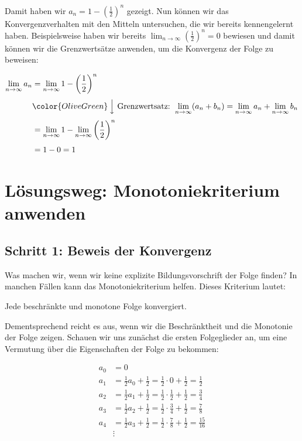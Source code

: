 \documentclass[fontsize=9pt,
               parskip=half-,
               DIV=14,
               listof=chapterentry,
               tocflat]{scrbook}
\begin{document}
Damit haben wir $a_{n}=1-\left({\frac {1}{2}}\right)^{n}$ gezeigt. Nun können wir das Konvergenzverhalten mit den Mitteln untersuchen, die wir bereits kennengelernt haben. Beispielsweise haben wir bereits $\lim _{n\to \infty }\left({\frac {1}{2}}\right)^{n}=0$ bewiesen und damit können wir die Grenzwertsätze anwenden, um die Konvergenz der Folge zu beweisen:

\begin{align*}
\lim _{n\to \infty }a_{n}&=\lim _{n\to \infty }1-\left({\frac {1}{2}}\right)^{n}\\[0.3em]&{\color {OliveGreen}\left\downarrow \ {\text{Grenzwertsatz: }}\lim _{n\to \infty }(a_{n}+b_{n})=\lim _{n\to \infty }a_{n}+\lim _{n\to \infty }b_{n}\right.}\\[0.3em]&=\lim _{n\to \infty }1-\lim _{n\to \infty }\left({\frac {1}{2}}\right)^{n}\\[0.3em]&=1-0=1
\end{align*}
\clearpage
\section{Lösungsweg: Monotoniekriterium anwenden}

\subsection{Schritt 1: Beweis der Konvergenz}

Was machen wir, wenn wir keine explizite Bildungsvorschrift der Folge finden? In manchen Fällen kann das Monotoniekriterium helfen. Dieses Kriterium lautet:

\begin{importantparagraph*}
Jede beschränkte und monotone Folge konvergiert.

\end{importantparagraph*}

Dementsprechend reicht es aus, wenn wir die Beschränktheit und die Monotonie der Folge zeigen. Schauen wir uns zunächst die ersten Folgeglieder an, um eine Vermutung über die Eigenschaften der Folge zu bekommen:

\begin{align*}
a_{0}&=0\\[0.3em]a_{1}&={\frac {1}{2}}a_{0}+{\frac {1}{2}}={\frac {1}{2}}\cdot 0+{\frac {1}{2}}={\frac {1}{2}}\\[0.3em]a_{2}&={\frac {1}{2}}a_{1}+{\frac {1}{2}}={\frac {1}{2}}\cdot {\frac {1}{2}}+{\frac {1}{2}}={\frac {3}{4}}\\[0.3em]a_{3}&={\frac {1}{2}}a_{2}+{\frac {1}{2}}={\frac {1}{2}}\cdot {\frac {3}{4}}+{\frac {1}{2}}={\frac {7}{8}}\\[0.3em]a_{4}&={\frac {1}{2}}a_{3}+{\frac {1}{2}}={\frac {1}{2}}\cdot {\frac {7}{8}}+{\frac {1}{2}}={\frac {15}{16}}\\[0.3em]&\vdots 
\end{align*}
\end{document}
